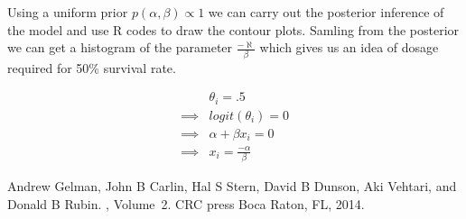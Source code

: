 \documentclass[twoside]{article}
\begin{document}
Using a uniform prior $p(\alpha,\beta) \propto 1$ we can carry out the posterior inference of the model and use R codes to draw the contour plots. Samling from the posterior we can get a histogram of the parameter $\frac{-\aleph}{\beta}$ which gives us an idea of dosage required for 50\% survival rate. 

\begin{align*}
& \theta_i = .5\\
\implies& logit(\theta_i) = 0\\
\implies & \alpha +\beta x_i = 0\\
\implies & x_i = \frac{-\alpha}{\beta}
\end{align*}

\begin{thebibliography}{}



Andrew Gelman, John B Carlin, Hal S Stern, David B Dunson, Aki Vehtari, and Donald B Rubin.
, Volume~2.
\newblock CRC press Boca Raton, FL, 2014.

\end{thebibliography}
\end{document}
